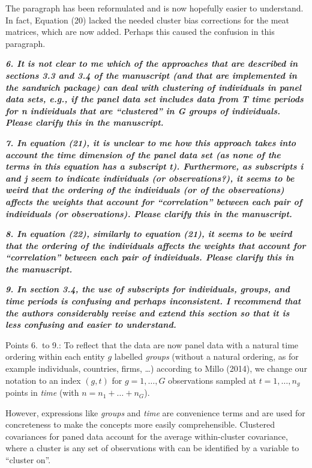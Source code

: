 \documentclass[10pt,a4paper]{article}
\begin{document}
The paragraph has been reformulated and is now hopefully easier to understand. In fact, Equation (20) lacked the needed cluster bias corrections for the meat matrices, which are now added. Perhaps this caused the confusion in this paragraph.

\medskip

\textbf{\textit{6. It is not clear to me which of the approaches that are described in sections 3.3 and 3.4
of the manuscript (and that are implemented in the sandwich package) can deal with clustering of individuals in panel data sets, e.g., if the panel data set includes data from T time periods for n individuals that are ``clustered'' in G groups of individuals. Please clarify this in the manuscript.}}

\medskip

\textbf{\textit{7. In equation (21), it is unclear to me how this approach takes into account the time
dimension of the panel data set (as none of the terms in this equation has a subscript t).
Furthermore, as subscripts i and j seem to indicate individuals (or observations?), it
seems to be weird that the ordering of the individuals (or of the observations) affects the
weights that account for ``correlation'' between each pair of individuals (or observations).
Please clarify this in the manuscript.}}

\medskip

\textbf{\textit{8. In equation (22), similarly to equation (21), it seems to be weird that the ordering of
the individuals affects the weights that account for ``correlation'' between each pair of
individuals. Please clarify this in the manuscript.}}

\medskip

\textbf{\textit{9. In section 3.4, the use of subscripts for individuals, groups, and time periods is confusing
and perhaps inconsistent. I recommend that the authors considerably revise and extend
this section so that it is less confusing and easier to understand.}}

\medskip

 Points 6.~to 9.: To reflect that the data are now panel data with a natural time ordering within each entity $g$ labelled \emph{groups} (without a natural ordering, as for example individuals, countries, firms, \ldots) according to Millo (2014), we change our notation
to an index $(g, t)$ for $g = 1, \dots, G$ observations sampled at $t = 1, \ldots, n_g$ points in \emph{time} (with $n = n_1 + \dots + n_G$).

However, expressions like \emph{groups} and \emph{time} are convenience terms and are used for concreteness to make the concepts more easily comprehensible. Clustered covariances for paned data account for the average within-cluster covariance, where a cluster is any set of observations with can be identified by a variable to ``cluster on''. 
\end{document}
